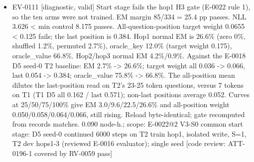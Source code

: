 \documentclass[11pt]{article}
\begin{document}
\begin{itemize}
\item EV-0111 [diagnostic, valid] Start stage fails the hop1 H3 gate (E-0022 rule 1), so the ten arms were not trained. EM margin 85/334 = 25.4 pp passes. NLL 3.626 \textless{} min control 8.175 passes. All-question-position target weight 0.0655 \textless{} 0.125 fails; the last position is 0.384. Hop1 normal EM is 26.6\% (zero 0\%, shuffled 1.2\%, permuted 2.7\%), oracle\_key 12.0\% (target weight 0.175), oracle\_value 66.8\%. Hop2/hop3 normal EM 4.2\%/0.9\%. Against the E-0018 D5 seed-0 T2 baseline: EM 2.7\% -\textgreater{} 26.6\%; target weight all 0.036 -\textgreater{} 0.066, last 0.054 -\textgreater{} 0.384; oracle\_value 75.8\% -\textgreater{} 66.8\%. The all-position mean dilutes the last-position read on T2's 23-25 token questions, versus 7 tokens on T1 (T1 D5 all 0.162 / last 0.571); non-last positions average 0.052. Curves at 25/50/75/100\% give EM 3.0/9.6/22.5/26.6\% and all-position weight 0.050/0.058/0.064/0.066, still rising. Reload byte-identical; gate recomputed from records matches. 0.090 node-h.; scope: E-0022@2 V3-S0 common start stage: D5 seed-0 continued 6000 steps on T2 train hop1, isolated write, S=1, T2 dev hops1-3 (reviewed E-0016 evaluator); single seed [code review: ATT-0196-1 covered by RV-0059 pass]

\end{itemize}
\end{document}
